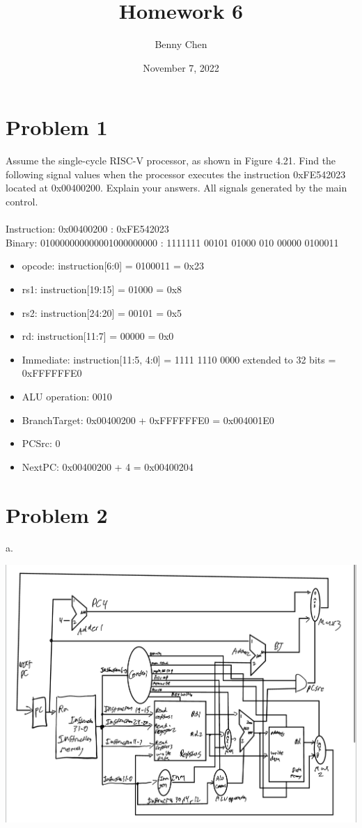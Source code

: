 \documentclass{article}
\title{Homework 6}
\author{Benny Chen}
\date{November 7, 2022}
\begin{document}
\maketitle

\section*{Problem 1}
Assume the single-cycle RISC-V processor, as shown in Figure 4.21. Find the following
signal values when the processor executes the instruction 0xFE542023 located at
0x00400200. Explain your answers.
All signals generated by the main control. \\\\
Instruction: 0x00400200 : 0xFE542023 \\
Binary: 010000000000001000000000 : 1111111 00101 01000 010 00000 0100011
\begin{itemize}
    \item opcode: instruction[6:0] = 0100011 = 0x23
    \item rs1: instruction[19:15] = 01000 = 0x8
    \item rs2: instruction[24:20] = 00101 = 0x5
    \item rd: instruction[11:7] = 00000 = 0x0
    \item Immediate: instruction[11:5, 4:0] = 1111 1110 0000 extended to 32 bits = 0xFFFFFFE0
    \item ALU operation: 0010
    \item BranchTarget: 0x00400200 + 0xFFFFFFE0 = 0x004001E0
    \item PCSrc: 0
    \item NextPC: 0x00400200 + 4 = 0x00400204
\end{itemize}
\newpage

\section*{Problem 2}
a.
\begin{center}
    \includegraphics[scale=.19]{./images/normal.png}
\end{center}
\end{document}
